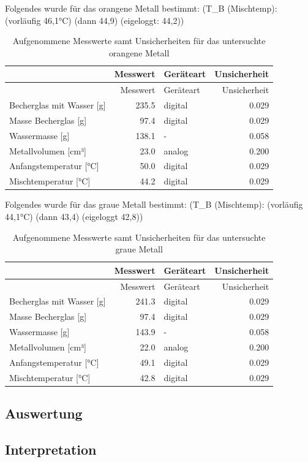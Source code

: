 \documentclass[
  9pt,
]{article}
\begin{document}
Folgendes wurde für das orangene Metall bestimmt: (T\_B (Mischtemp):
(vorläufig 46,1°C) (dann 44,9) (eigeloggt: 44,2))

\begin{longtable}[]{@{}lrlr@{}}
\caption{Aufgenommene Messwerte samt Unsicherheiten für das untersuchte
orangene Metall}\tabularnewline
\toprule()
& Messwert & Geräteart & Unsicherheit \\
\midrule()
\endfirsthead
\toprule()
& Messwert & Geräteart & Unsicherheit \\
\midrule()
\endhead
Becherglas mit Wasser {[}g{]} & 235.5 & digital & 0.029 \\
Masse Becherglas {[}g{]} & 97.4 & digital & 0.029 \\
Wassermasse {[}g{]} & 138.1 & - & 0.058 \\
Metallvolumen {[}cm³{]} & 23.0 & analog & 0.200 \\
Anfangstemperatur {[}°C{]} & 50.0 & digital & 0.029 \\
Mischtemperatur {[}°C{]} & 44.2 & digital & 0.029 \\
\bottomrule()
\end{longtable}

Folgendes wurde für das graue Metall bestimmt: (T\_B (Mischtemp):
(vorläufig 44,1°C) (dann 43,4) (eigeloggt 42,8))

\begin{longtable}[]{@{}lrlr@{}}
\caption{Aufgenommene Messwerte samt Unsicherheiten für das untersuchte
graue Metall}\tabularnewline
\toprule()
& Messwert & Geräteart & Unsicherheit \\
\midrule()
\endfirsthead
\toprule()
& Messwert & Geräteart & Unsicherheit \\
\midrule()
\endhead
Becherglas mit Wasser {[}g{]} & 241.3 & digital & 0.029 \\
Masse Becherglas {[}g{]} & 97.4 & digital & 0.029 \\
Wassermasse {[}g{]} & 143.9 & - & 0.058 \\
Metallvolumen {[}cm³{]} & 22.0 & analog & 0.200 \\
Anfangstemperatur {[}°C{]} & 49.1 & digital & 0.029 \\
Mischtemperatur {[}°C{]} & 42.8 & digital & 0.029 \\
\bottomrule()
\end{longtable}

\hypertarget{auswertung-1}{%
\subsection{Auswertung}\label{auswertung-1}}

\hypertarget{interpretation-1}{%
\subsection{Interpretation}\label{interpretation-1}}
\end{document}
